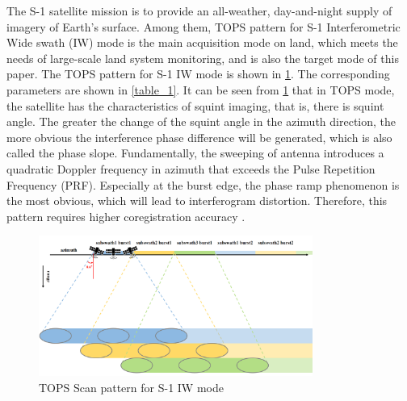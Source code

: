 \documentclass[preprint, authoryear]{elsarticle}
\begin{document}
The S-1 satellite mission is to provide an all-weather, day-and-night supply of imagery of Earth’s surface. Among them, TOPS pattern for S-1 Interferometric Wide swath (IW) mode is the main acquisition mode on land, which meets the needs of large-scale land system monitoring, and is also the target mode of this paper. The TOPS pattern for S-1 IW mode is shown in \ref{fig_1}. The corresponding parameters are shown in \ref{table_1}. It can be seen from \ref{fig_1} that in TOPS mode, the satellite has the characteristics of squint imaging, that is, there is squint angle. The greater the change of the squint angle in the azimuth direction, the more obvious the interference phase difference will be generated, which is also called the phase slope. Fundamentally, the sweeping of antenna introduces a quadratic Doppler frequency in azimuth that exceeds the Pulse Repetition Frequency (PRF). Especially at the burst edge, the phase ramp phenomenon is the most obvious, which will lead to interferogram distortion. Therefore, this pattern requires higher coregistration accuracy \cite{Interferometry_with_TOPS:_coregistration_and_azimuth_shifts}. \par

\begin{figure}
	\centering
	\includegraphics[width=0.8\textwidth]{figure/TOPS Scan pattern for S-1 IW mode.png}
	\caption{TOPS Scan pattern for S-1 IW mode}
	\label{fig_1}%
\end{figure}
\end{document}
